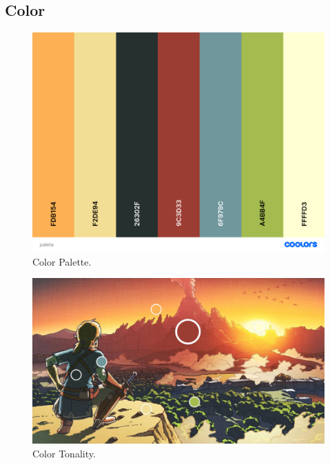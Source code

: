\documentclass{cup-pan}
\begin{document}
        \subsection{Color}

             \begin{figure}[H]
                \includegraphics[width=\textwidth]{Imagenes/Referencias/Analisis_ConceptArt/paleta.png}
                \caption{Color Palette.}
            \end{figure}

            \begin{figure}[H]
                \includegraphics[width=\textwidth]{Imagenes/Referencias/Analisis_ConceptArt/tonalidad.png}
                \caption{Color Tonality.}
            \end{figure}
\end{document}
